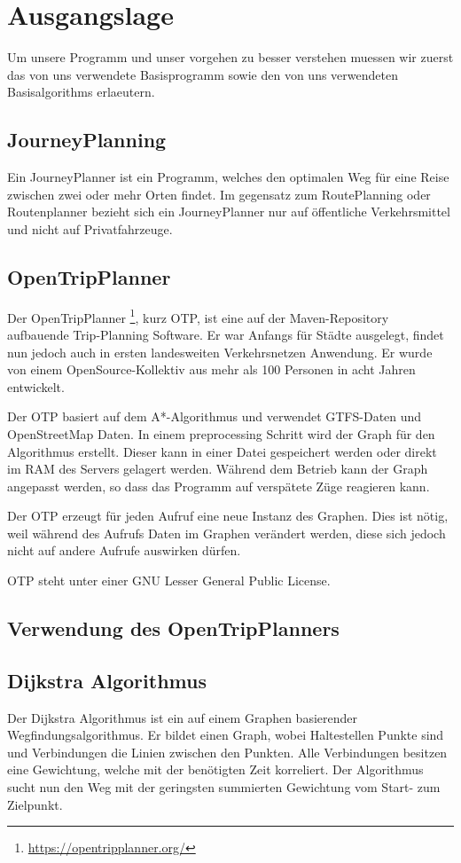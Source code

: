 \section{Ausgangslage}
Um unsere Programm und unser vorgehen zu besser verstehen muessen wir zuerst das von uns verwendete Basisprogramm sowie den von uns verwendeten Basisalgorithms erlaeutern.

\subsection{JourneyPlanning}
Ein JourneyPlanner ist ein Programm, welches den optimalen Weg für eine Reise zwischen zwei oder mehr Orten findet. Im gegensatz zum RoutePlanning oder Routenplanner bezieht sich ein JourneyPlanner nur auf öffentliche Verkehrsmittel und nicht auf Privatfahrzeuge.

\subsection{OpenTripPlanner}

Der OpenTripPlanner \cite{otp} \footnote{\url{https://opentripplanner.org/}}, kurz OTP, ist eine auf der Maven-Repository 
aufbauende Trip-Planning Software. Er war Anfangs für Städte ausgelegt, findet nun jedoch auch in ersten landesweiten Verkehrsnetzen Anwendung. Er wurde von einem OpenSource-Kollektiv aus mehr als 100 Personen in acht Jahren entwickelt.

Der OTP basiert auf dem A*-Algorithmus und verwendet GTFS-Daten und OpenStreetMap Daten. In einem preprocessing Schritt wird der Graph für den Algorithmus erstellt. Dieser kann in einer Datei gespeichert werden oder direkt im RAM des Servers gelagert werden. Während dem Betrieb kann der Graph angepasst werden, so dass das Programm auf verspätete Züge reagieren kann. 

Der OTP erzeugt für jeden Aufruf eine neue Instanz des Graphen. Dies ist nötig, weil während des Aufrufs Daten im Graphen verändert werden, diese sich jedoch nicht auf andere Aufrufe auswirken dürfen.

OTP steht unter einer GNU Lesser General Public License. 


\subsection{Verwendung des OpenTripPlanners}


\subsection{Dijkstra Algorithmus}
Der Dijkstra Algorithmus \cite{dij_bell} ist ein auf einem Graphen basierender Wegfindungsalgorithmus. Er bildet einen Graph, wobei Haltestellen Punkte sind und Verbindungen die Linien zwischen den Punkten. Alle Verbindungen besitzen eine Gewichtung, welche mit der benötigten Zeit korreliert. Der Algorithmus sucht nun den Weg mit der geringsten summierten Gewichtung vom Start- zum Zielpunkt.

